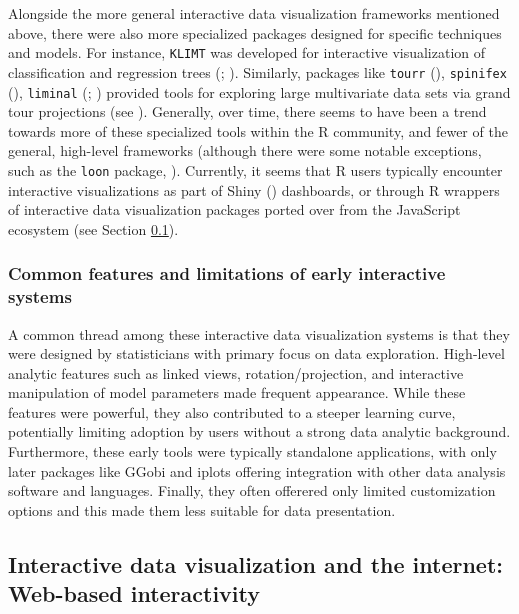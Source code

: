 \documentclass[
]{book}
\begin{document}
Alongside the more general interactive data visualization frameworks mentioned above, there were also more specialized packages designed for specific techniques and models. For instance, \texttt{KLIMT} was developed for interactive visualization of classification and regression trees (; ). Similarly, packages like \texttt{tourr} (), \texttt{spinifex} (), \texttt{liminal} (; ) provided tools for exploring large multivariate data sets via grand tour projections (see ). Generally, over time, there seems to have been a trend towards more of these specialized tools within the R community, and fewer of the general, high-level frameworks (although there were some notable exceptions, such as the \texttt{loon} package, ). Currently, it seems that R users typically encounter interactive visualizations as part of Shiny () dashboards, or through R wrappers of interactive data visualization packages ported over from the JavaScript ecosystem (see Section \ref{web-based}).

\subsubsection{Common features and limitations of early interactive systems}\label{common-features-and-limitations-of-early-interactive-systems}

A common thread among these interactive data visualization systems is that they were designed by statisticians with primary focus on data exploration. High-level analytic features such as linked views, rotation/projection, and interactive manipulation of model parameters made frequent appearance. While these features were powerful, they also contributed to a steeper learning curve, potentially limiting adoption by users without a strong data analytic background. Furthermore, these early tools were typically standalone applications, with only later packages like GGobi and iplots offering integration with other data analysis software and languages. Finally, they often offerered only limited customization options and this made them less suitable for data presentation.

\subsection{Interactive data visualization and the internet: Web-based interactivity}\label{web-based}
\end{document}
